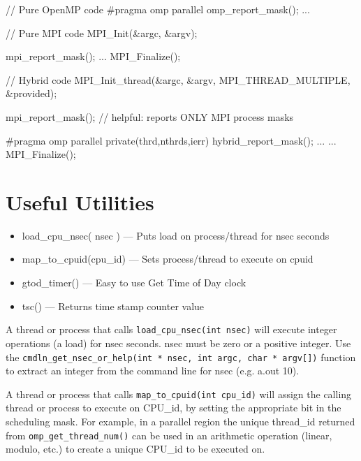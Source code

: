 \documentclass[10pt,a4paper]{report}
\begin{document}
\begin{code}[frame=single,breaklines=true,numbers=left,language=C,caption=Invoking mask report inside code\label{code:apimask}]
 // Pure OpenMP code
    #pragma omp parallel
    {
       omp_report_mask();
     ...
    }

 // Pure MPI code
    MPI_Init(&argc, &argv);

       mpi_report_mask();
    ...
    MPI_Finalize();

 // Hybrid code
    MPI_Init_thread(&argc, &argv, MPI_THREAD_MULTIPLE, &provided);

    mpi_report_mask();  // helpful: reports ONLY MPI process masks

   #pragma omp parallel private(thrd,nthrds,ierr)
   {
      hybrid_report_mask();
      ...
   }
   ...
   MPI_Finalize();
\end{code}


\section{Useful Utilities}
\begin{itemize}
\item load\_cpu\_nsec( nsec )   --- Puts load on process/thread for nsec seconds
\item map\_to\_cpuid(cpu\_id)   --- Sets process/thread to execute on cpuid
\item gtod\_timer()           --- Easy to use Get Time of Day clock
\item tsc() --- Returns time stamp counter value
\end{itemize}

A thread or process that calls \verb+load_cpu_nsec(int nsec)+ will execute integer
operations (a load) for nsec seconds.  nsec must be zero or a positive integer.  Use the
\verb+cmdln_get_nsec_or_help(int * nsec, int argc, char * argv[])+ function to extract an
integer from the command line for nsec (e.g. a.out 10).


A thread or process that calls \verb+map_to_cpuid(int cpu_id)+ will assign the
calling thread or process to execute on CPU\_id, by setting the appropriate
bit in the scheduling mask.  For example, in a parallel region the unique
thread\_id returned from \verb+omp_get_thread_num()+ can be used in an
arithmetic operation (linear, modulo, etc.) to create a unique CPU\_id to be executed on. 
\end{document}
